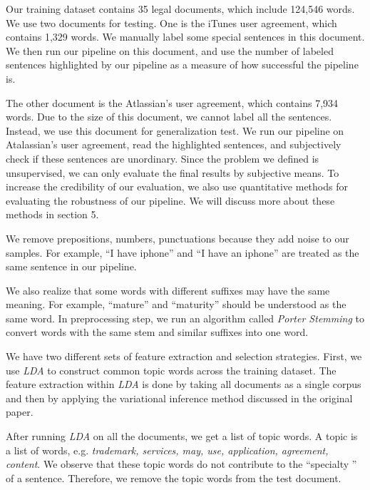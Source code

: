 \documentclass[conference,compsoc]{IEEEtran}
\begin{document}
  Our training dataset contains 35 legal documents, which include 124,546 words. We use two documents for testing. One is the iTunes user agreement, which contains 1,329 words. We manually label some special sentences in this document. We then run our pipeline on this document, and use the number of labeled sentences highlighted by our pipeline as a measure of how successful the pipeline is. 

  The other document is the Atlassian's user agreement, which contains 7,934 words. Due to the size of this document, we cannot label all the sentences. Instead, we use this document for generalization test. We run our pipeline on Atalassian's user agreement, read the highlighted sentences, and subjectively check if these sentences are unordinary. Since the problem we defined is unsupervised, we can only evaluate the final results by subjective means. To increase the credibility of our evaluation, we also use quantitative methods for evaluating the robustness of our pipeline. We will discuss more about these methods in section 5. 

  We remove prepositions, numbers, punctuations because they add noise to our samples. For example, ``I have iphone'' and ``I have an iphone'' are treated as the same sentence in our pipeline. 


  We also realize that some words with different suffixes may have the same meaning. For example, ``mature'' and ``maturity'' should be understood as the same word. In preprocessing step, we run an algorithm called \emph{Porter Stemming} \cite{porter} to convert words with the same stem and similar suffixes into one word. 

  We have two different sets of feature extraction and selection strategies. First, we use \emph{LDA} to construct common topic words across the training dataset. The feature extraction within \emph{LDA} is done by taking all documents as a single corpus and then by applying the variational inference method discussed in the original paper. 

  After running \emph{LDA} on all the documents, we get a list of topic words. A topic is a list of words, e.g. \emph{trademark, services, may, use, application, agreement, content}. We observe that these topic words do not contribute to the ``specialty '' of a sentence. Therefore, we remove the topic words from the test document.
\end{document}
